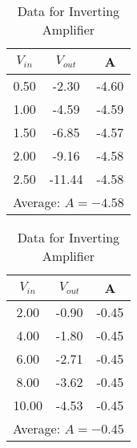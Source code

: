 \documentclass[12pt]{article}
\begin{document}
\begin{table}[H]
  \begin{subtable}{0.48\textwidth}
    \centering
    \begin{tabular}{|c|c|c|}
        \hline
        $V_{in}$ & $V_{out}$ & A \\
        \hline
        0.50 & -2.30 & -4.60 \\
        1.00 & -4.59 & -4.59 \\
        1.50 & -6.85 & -4.57 \\
        2.00 & -9.16 & -4.58 \\
        2.50 & -11.44 & -4.58 \\
        \hline
        \multicolumn{3}{|c|}{Average: $A = -4.58$} \\
        \hline
    \end{tabular}
    \caption{$R_i=2160\Omega, R_f=9850\Omega$}
    \label{tab:first}
\end{subtable}
\hfill
\begin{subtable}{0.48\textwidth}
    \centering
    \begin{tabular}{|c|c|c|}
        \hline
        $V_{in}$ & $V_{out}$ & A \\
        \hline
        2.00 & -0.90 & -0.45 \\
        4.00 & -1.80 & -0.45 \\
        6.00 & -2.71 & -0.45 \\
        8.00 & -3.62 & -0.45 \\
        10.00 & -4.53 & -0.45 \\
        \hline
        \multicolumn{3}{|c|}{Average: $A = -0.45$} \\
        \hline
    \end{tabular}
    \caption{$R_i=21800\Omega, R_f=9850\Omega$}
    \label{tab:second}
    \end{subtable}
  \caption{Data for Inverting Amplifier}
  \label{tab:combined}
\end{table}
\end{document}
